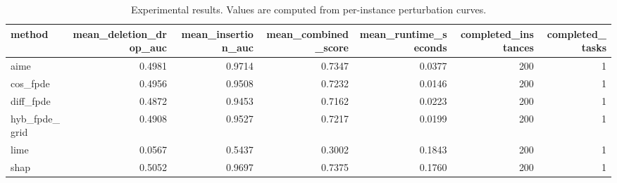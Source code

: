 \begin{table}[t]
\caption{Experimental results. Values are computed from per-instance perturbation curves.}
\label{tab:main_results_computed}
\centering
\begin{tabular}{lrrrrrr}
\toprule
method & mean\_deletion\_drop\_auc & mean\_insertion\_auc & mean\_combined\_score & mean\_runtime\_seconds & completed\_instances & completed\_tasks \\
\midrule
aime & 0.4981 & 0.9714 & 0.7347 & 0.0377 & 200 & 1 \\
cos\_fpde & 0.4956 & 0.9508 & 0.7232 & 0.0146 & 200 & 1 \\
diff\_fpde & 0.4872 & 0.9453 & 0.7162 & 0.0223 & 200 & 1 \\
hyb\_fpde\_grid & 0.4908 & 0.9527 & 0.7217 & 0.0199 & 200 & 1 \\
lime & 0.0567 & 0.5437 & 0.3002 & 0.1843 & 200 & 1 \\
shap & 0.5052 & 0.9697 & 0.7375 & 0.1760 & 200 & 1 \\
\bottomrule
\end{tabular}

\end{table}
